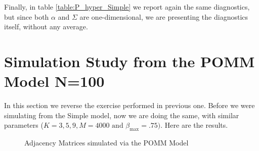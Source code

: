 \documentclass[11pt]{amsart}
\begin{document}
Finally, in table \eqref{table:P_hyper_Simple} we report again the same diagnostics, but since both $\alpha$ and $\Sigma$ are one-dimensional, we are presenting the diagnostics itself, without any average.




\clearpage


\section{Simulation Study from the POMM Model N=100}

In this section we reverse the exercise performed in previous one. Before we were simulating from the Simple model, now we are doing the same, with similar parameters ($K=3,5,9, M=4000 \text{ and } \beta_{\max} = .75)$. Here are the results.

\begin{figure}[h]
    \centering
    \hfill
    \hfill
    \caption{Adjacency Matrices simulated via the POMM Model}
    \label{fig:all_images}
\end{figure}
\end{document}
